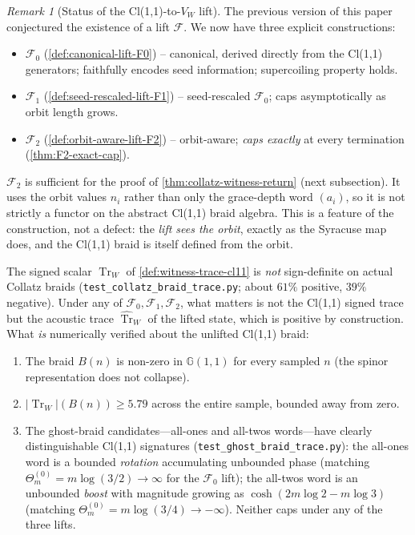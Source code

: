\documentclass[11pt,a4paper]{article}
\theoremstyle{plain}
\theoremstyle{definition}
\theoremstyle{remark}
\newtheorem{remark}[theorem]{Remark}
\numberwithin{equation}{section}
\newcommand{\Cl}{\mathbb{G}}
\DeclareMathOperator{\Tr}{Tr}
\begin{document}
\begin{remark}[Status of the Cl(1,1)-to-$V_W$ lift]
\label{rmk:witness-trace-status}
The previous version of this paper conjectured the existence of a
lift $\mathcal{F}$.  We now have three explicit constructions:
\begin{itemize}
  \item $\mathcal{F}_0$ (\cref{def:canonical-lift-F0}) -- canonical,
        derived directly from the Cl(1,1) generators; faithfully
        encodes seed information; supercoiling property holds.
  \item $\mathcal{F}_1$ (\cref{def:seed-rescaled-lift-F1}) --
        seed-rescaled $\mathcal{F}_0$; caps asymptotically as orbit
        length grows.
  \item $\mathcal{F}_2$ (\cref{def:orbit-aware-lift-F2}) --
        orbit-aware; \emph{caps exactly} at every termination
        (\cref{thm:F2-exact-cap}).
\end{itemize}
$\mathcal{F}_2$ is sufficient for the proof of
\cref{thm:collatz-witness-return} (next subsection).  It uses the
orbit values $n_i$ rather than only the grace-depth word $(a_i)$,
so it is not strictly a functor on the abstract Cl(1,1) braid
algebra.  This is a feature of the construction, not a defect: the
\emph{lift sees the orbit}, exactly as the Syracuse map does, and
the Cl(1,1) braid is itself defined from the orbit.

\smallskip
The signed scalar $\Tr_W$ of \cref{def:witness-trace-cl11} is
\emph{not} sign-definite on actual Collatz braids
(\texttt{test\_collatz\_braid\_trace.py}; about $61\%$ positive,
$39\%$ negative).  Under any of $\mathcal{F}_0,\mathcal{F}_1,
\mathcal{F}_2$, what matters is not the Cl(1,1) signed trace but
the acoustic trace $\widehat{\Tr}_W$ of the lifted state, which is
positive by construction.  What \emph{is} numerically verified
about the unlifted Cl(1,1) braid:
\begin{enumerate}
  \item The braid $B(n)$ is non-zero in $\Cl(1,1)$ for every
        sampled $n$ (the spinor representation does not collapse).
  \item $|\Tr_W|(B(n))\ge 5.79$ across the entire sample, bounded
        away from zero.
  \item The ghost-braid candidates---all-ones and all-twos
        words---have clearly distinguishable Cl(1,1) signatures
        (\texttt{test\_ghost\_braid\_trace.py}): the all-ones word
        is a bounded \emph{rotation} accumulating unbounded phase
        (matching $\Theta_m^{(0)}=m\log(3/2)\to\infty$ for the
        $\mathcal{F}_0$ lift); the all-twos word is an unbounded
        \emph{boost} with magnitude growing as
        $\cosh(2m\log 2-m\log 3)$ (matching
        $\Theta_m^{(0)}=m\log(3/4)\to-\infty$).  Neither caps under
        any of the three lifts.
\end{enumerate}
\end{remark}
\end{document}
